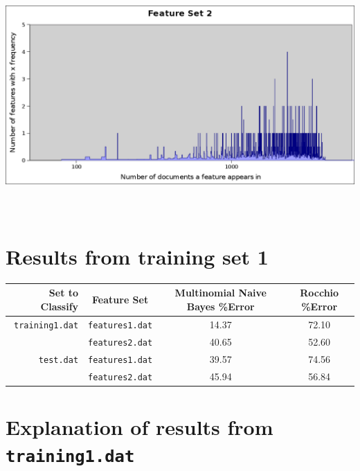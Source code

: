 \documentclass[11pt]{article}
\begin{document}
\begin{center}
 \includegraphics[width=15cm, height=9cm]{../set2.png}
\end{center}



\section{Results from training set 1}

\centering
\begin{tabular}{r|c|c|c}
\textbf{Set to Classify} & \textbf{Feature Set} & \textbf{Multinomial Naive Bayes \%Error} &\textbf{Rocchio \%Error}\\
\hline
\texttt{training1.dat} & \texttt{features1.dat} & 14.37 & 72.10 \\
& \texttt{features2.dat} & 40.65 & 52.60 \\
\texttt{test.dat} & \texttt{features1.dat} & 39.57 & 74.56 \\
& \texttt{features2.dat} & 45.94 & 56.84 \\
\end{tabular}
\flushleft

\section{Explanation of results from \texttt{training1.dat}}
\end{document}
